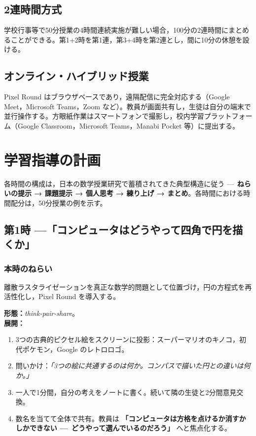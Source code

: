 \documentclass[12pt,a4paper]{scrartcl}
\newcommand{\acc}[1]{\textcolor{accent}{\textbf{#1}}}
\newcommand{\jikan}[1]{\textnormal{\footnotesize\color{bg!90!white}\textsf{#1}}}
\begin{document}
\subsection{2連時間方式}
学校行事等で50分授業の4時間連続実施が難しい場合，100分の2連時間にまとめることができる。第1+2時を第1連，第3+4時を第2連とし，間に10分の休憩を設ける。

\subsection{オンライン・ハイブリッド授業}
Pixel Round はブラウザベースであり，遠隔配信に完全対応する（Google Meet，Microsoft Teams，Zoom など）。教員が画面共有し，生徒は自分の端末で並行操作する。方眼紙作業はスマートフォンで撮影し，校内学習プラットフォーム（Google Classroom，Microsoft Teams，Manabi Pocket 等）に提出する。

\section{学習指導の計画}

各時間の構成は，日本の数学授業研究で蓄積されてきた典型構造に従う ---\, \acc{ねらいの提示 → 課題提示 → 個人思考 → 練り上げ → まとめ}。各時間における時間配分は，50分授業の例を示す。

\subsection{第1時 ---「コンピュータはどうやって四角で円を描くか」}\label{ji1}

\subsubsection*{本時のねらい}
離散ラスタライゼーションを真正な数学的問題として位置づけ，円の方程式を再活性化し，Pixel Round を導入する。

\medskip

\begin{katsudou}[1.1 ---\, 導入：問いの提示 \quad\jikan{8分}]
\textbf{形態：}\emph{think-pair-share}。\\[0.4em]
\textbf{展開：}
\begin{enumerate}[leftmargin=1.5em,itemsep=0.2em,topsep=0.3em,nosep]
  \item 3つの古典的ピクセル絵をスクリーンに投影：スーパーマリオのキノコ，初代ポケモン，Google のレトロロゴ。
  \item 問いかけ：\emph{「3つの絵に共通するのは何か。コンパスで描いた円との違いは何か。」}
  \item 一人で1分間，自分の考えをノートに書く。続いて隣の生徒と2分間意見交換。
  \item 数名を当てて全体で共有。教員は \acc{「コンピュータは方格を点けるか消すかしかできない ---\, どうやって選んでいるのだろう」} へと焦点化する。
\end{enumerate}
\end{katsudou}
\end{document}

